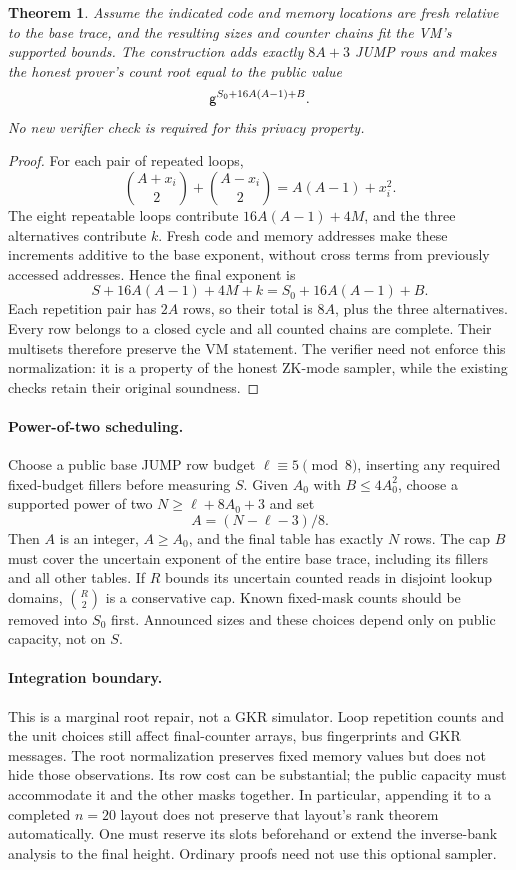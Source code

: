 \documentclass[11pt]{article}
\newtheorem{theorem}{Theorem}
\begin{document}
\begin{theorem}
Assume the indicated code and memory locations are fresh relative to the base trace, and the resulting sizes and counter chains fit the VM's supported bounds. The construction adds exactly $8A+3$ JUMP rows and makes the honest prover's count root equal to the public value
\[
 \mathsf{g}^{S_0+16A(A-1)+B}.
\]
No new verifier check is required for this privacy property.
\end{theorem}
\begin{proof}
For each pair of repeated loops,
\[
 \binom{A+x_i}{2}+\binom{A-x_i}{2}=A(A-1)+x_i^2.
\]
The eight repeatable loops contribute $16A(A-1)+4M$, and the three alternatives contribute $k$. Fresh code and memory addresses make these increments additive to the base exponent, without cross terms from previously accessed addresses. Hence the final exponent is
\[
 S+16A(A-1)+4M+k=S_0+16A(A-1)+B.
\]
Each repetition pair has $2A$ rows, so their total is $8A$, plus the three alternatives. Every row belongs to a closed cycle and all counted chains are complete. Their multisets therefore preserve the VM statement. The verifier need not enforce this normalization: it is a property of the honest ZK-mode sampler, while the existing checks retain their original soundness.
\end{proof}

\paragraph{Power-of-two scheduling.} Choose a public base JUMP row budget $\ell\equiv5\pmod8$, inserting any required fixed-budget fillers before measuring $S$. Given $A_0$ with $B\le4A_0^2$, choose a supported power of two $N\ge\ell+8A_0+3$ and set
\[
 A=(N-\ell-3)/8.
\]
Then $A$ is an integer, $A\ge A_0$, and the final table has exactly $N$ rows. The cap $B$ must cover the uncertain exponent of the entire base trace, including its fillers and all other tables. If $R$ bounds its uncertain counted reads in disjoint lookup domains, $\binom R2$ is a conservative cap. Known fixed-mask counts should be removed into $S_0$ first. Announced sizes and these choices depend only on public capacity, not on $S$.

\paragraph{Integration boundary.} This is a marginal root repair, not a GKR simulator. Loop repetition counts and the unit choices still affect final-counter arrays, bus fingerprints and GKR messages. The root normalization preserves fixed memory values but does not hide those observations. Its row cost can be substantial; the public capacity must accommodate it and the other masks together. In particular, appending it to a completed $n=20$ layout does not preserve that layout's rank theorem automatically. One must reserve its slots beforehand or extend the inverse-bank analysis to the final height. Ordinary proofs need not use this optional sampler.
\end{document}
